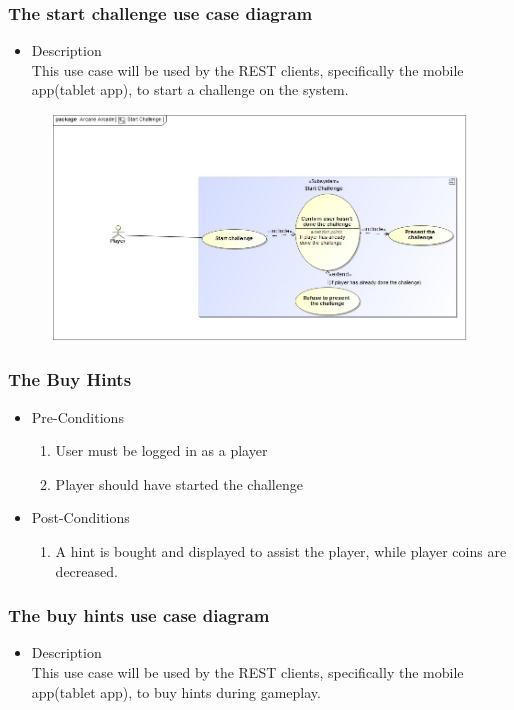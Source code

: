 \documentclass[english]{article}
\begin{document}
		
		\subsubsection* {The start challenge use case diagram}
		\begin{itemize}
			\item Description\\
			This use case will be used by the REST clients, specifically the mobile app(tablet app), to start a challenge on the system.
		\end{itemize}
		
	
		\includegraphics[width=14cm,height=6cm,keepaspectratio]{startChallenge.jpg}
		
		\subsubsection{The Buy Hints}
		
			\begin{itemize}
	
		
		\item Pre-Conditions
			\begin{enumerate}
				
				\item User must be logged in as a player
				\item Player should have started the challenge
			\end{enumerate}
		\item Post-Conditions
			\begin{enumerate}
			\item A hint is bought and displayed to assist the player, while player coins are decreased.
						
			\end{enumerate}
	

		\end{itemize}
		
		
		\subsubsection* {The buy hints use case diagram}
		\begin{itemize}
			\item Description\\
			This use case will be used by the REST clients, specifically the mobile app(tablet app), to buy hints 
			during gameplay.
		\end{itemize}
		
\end{document}
